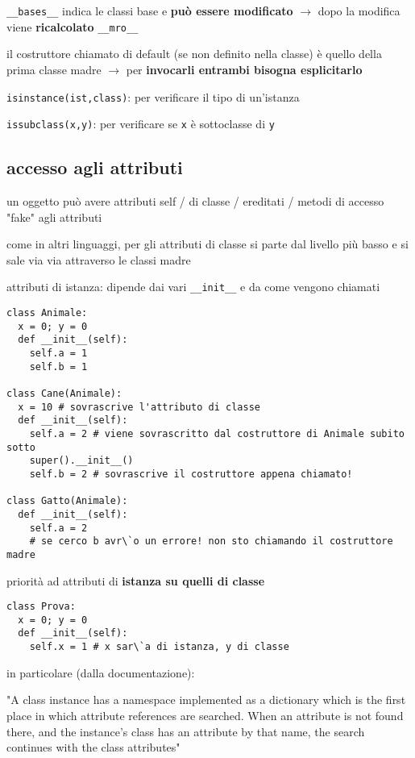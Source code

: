 \texttt{__bases__} indica le classi base e \textbf{pu\`o essere modificato} $\rightarrow$ dopo la modifica viene \textbf{ricalcolato} \texttt{__mro__}

il costruttore chiamato di default (se non definito nella classe) \`e quello della prima classe madre $\rightarrow$ per \textbf{invocarli entrambi bisogna esplicitarlo}

\texttt{isinstance(ist,class)}: per verificare il tipo di un'istanza

\texttt{issubclass(x,y)}: per verificare se \texttt{x} \`e sottoclasse di \texttt{y}

\subsection{accesso agli attributi}

un oggetto pu\`o avere attributi self / di classe / ereditati / metodi di accesso "fake" agli attributi

come in altri linguaggi, per gli attributi di classe si parte dal livello pi\`u basso e si sale via via attraverso le classi madre

attributi di istanza: dipende dai vari \texttt{__init__} e da come vengono chiamati

\begin{verbatim}
class Animale:
  x = 0; y = 0
  def __init__(self):
    self.a = 1
    self.b = 1
    
class Cane(Animale):
  x = 10 # sovrascrive l'attributo di classe
  def __init__(self):
    self.a = 2 # viene sovrascritto dal costruttore di Animale subito sotto
    super().__init__()
    self.b = 2 # sovrascrive il costruttore appena chiamato!
    
class Gatto(Animale):
  def __init__(self):
    self.a = 2
    # se cerco b avr\`o un errore! non sto chiamando il costruttore madre
\end{verbatim}

priorit\`a ad attributi di \textbf{istanza su quelli di classe}

\begin{verbatim}
class Prova:
  x = 0; y = 0
  def __init__(self):
    self.x = 1 # x sar\`a di istanza, y di classe
\end{verbatim}

in particolare (dalla documentazione):

\begin{displayquote}
 "A class instance has a namespace implemented as a dictionary which is the first place in which attribute references are searched. When an attribute is not found there, and the instance's class has an attribute by that name, the search continues with the class attributes"
\end{displayquote}

